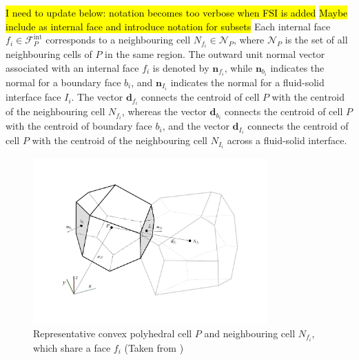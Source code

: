 \documentclass[sn-mathphys,Numbered]{sn-jnl}%
\begin{document}
\hl{I need to update below: notation becomes too verbose when FSI is added}
\hl{Maybe include as internal face and introduce notation for subsets}
Each internal face $f_i \in \mathcal{F}^{\text{int}}_P$ corresponds to a neighbouring cell $N_{f_i} \in \mathcal{N}_P$, where $\mathcal{N}_P$ is the set of all neighbouring cells of $P$ in the same region. The outward unit normal vector associated with an internal face $f_i$ is denoted by $\mathbf{n}_{f_i}$, while $\mathbf{n}_{b_i}$ indicates the normal for a boundary face $b_i$, and $\mathbf{n}_{I_i}$ indicates the normal for a fluid-solid interface face $I_i$.
The vector $\mathbf{d}_{f_i}$ connects the centroid of cell $P$ with the centroid of the neighbouring cell $N_{f_i}$, whereas the vector $\mathbf{d}_{b_i}$ connects the centroid of cell $P$ with the centroid of boundary face ${b_i}$, and the vector $\mathbf{d}_{I_i}$ connects the centroid of cell $P$ with the centroid of the neighbouring cell $N_{I_i}$ across a fluid-solid interface.
\begin{figure}[htbp]
	\centering
   		\includegraphics[width=0.8\textwidth]{figures/cell} 
	\caption{Representative convex polyhedral cell $P$ and neighbouring cell $N_{f_i}$, which share a face $f_i$ (Taken from \citet{Cardiff2025:JFNK})}
	\label{fig:cell}
\end{figure}







\end{document}
